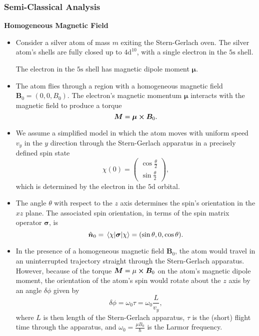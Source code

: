 \documentclass[11pt, a4paper]{article}
\newcommand{\SG}{Stern-Gerlach\xspace}
\renewcommand{\vec}[1]{\bm{#1}}  %
\newcommand{\uvec}[1]{\hat{\vec{#1}}}  %
\newcommand{\B}{\vec{B}}  %
\newcommand{\m}{\vec{\mu}}  %
\begin{document}
\subsubsection{Semi-Classical Analysis} \label{sss:sg-semi-classical}
\textbf{Homogeneous Magnetic Field}
\begin{itemize}

    \item Consider a silver atom of mass $ m $ exiting the Stern-Gerlach oven. The silver atom's shells are fully closed up to $ 4 \mathrm{d}^{10} $, with a single electron in the $ 5 \mathrm{s} $ shell.

    The electron in the $ 5 \mathrm{s} $ shell has magnetic dipole moment $ \m $.

    \item The atom flies through a region with a homogeneous magnetic field $ \B_{0} = (0, 0, B_{0}) $. The electron's magnetic momentum $ \m $ interacts with the magnetic field to produce a torque
    \begin{equation*}
        \vec{M} = \m \cross \B_{0}.
    \end{equation*}

    \item We assume a simplified model in which the atom moves with uniform speed $ v_{y} $ in the $ y $ direction through the Stern-Gerlach apparatus in a precisely defined spin state
    \begin{equation*}
        \chi(0) = 
        \begin{pmatrix}
            \cos \frac{\theta}{2}\\[1mm]
            \sin \frac{\theta}{2}
        \end{pmatrix},
    \end{equation*}
    which is determined by the electron in the $ 5 \mathrm{d} $ orbital.

    \item The angle $ \theta $ with respect to the $ z $ axis determines the spin's orientation in the $ xz $ plane. The associated spin orientation, in terms of the spin matrix operator $ \vec{\sigma} $, is
    \begin{equation*}
        \uvec{n}_{0} = \mel{\chi}{\vec{\sigma}}{\chi} = (\sin \theta, 0, \cos \theta).
    \end{equation*}

    \item In the presence of a homogeneous magnetic field $ \B_{0} $, the atom would travel in an uninterrupted trajectory straight through the Stern-Gerlach apparatus. However, because of the torque $ \vec{M} = \mu \cross \B_{0} $ on the atom's magnetic dipole moment, the orientation of the atom's spin would rotate about the $ z $ axis by an angle $ \delta\phi $ given by
    \begin{equation*}
        \delta \phi = \omega_{0} \tau = \omega_{0} \frac{L}{v_{y}},
    \end{equation*}
    where $ L $ is then length of the \SG apparatus, $ \tau $ is the (short) flight time through the apparatus, and $ \omega_{0} = \frac{\mu B_{0}}{\hbar} $ is the Larmor frequency.


\end{itemize}
\end{document}
